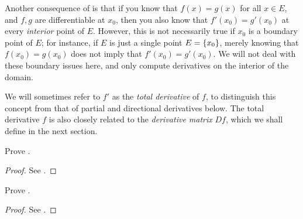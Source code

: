 \begin{note}
  Another consequence of  is that if you know that \(f(x) = g(x)\) for all \(x \in E\), and \(f, g\) are differentiable at \(x_0\), then you also know that \(f'(x_0) = g'(x_0)\) at every \emph{interior} point of \(E\).
  However, this is not necessarily true if \(x_0\) is a boundary point of \(E\);
  for instance, if \(E\) is just a single point \(E = \left\lbrace x_0\right\rbrace\), merely knowing that \(f(x_0) = g(x_0)\) does not imply that \(f'(x_0) = g'(x_0)\).
  We will not deal with these boundary issues here, and only compute derivatives on the interior of the domain.
\end{note}

\begin{note}
  We will sometimes refer to \(f'\) as the \emph{total derivative} of \(f\), to distinguish this concept from that of partial and directional derivatives below.
  The total derivative \(f\) is also closely related to the \emph{derivative matrix} \(Df\),
  which we shall define in the next section.
\end{note}

\exercisesection

\begin{ex}\label{ii:ex:6.2.1}
  Prove .
\end{ex}

\begin{proof}
  See .
\end{proof}

\begin{ex}\label{ii:ex:6.2.2}
  Prove .
\end{ex}

\begin{proof}
  See .
\end{proof}
